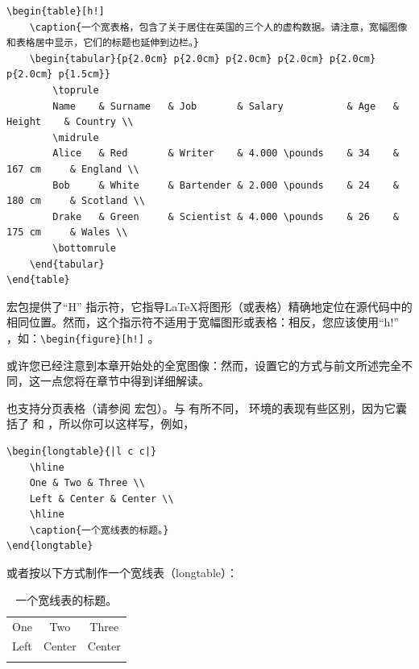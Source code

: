 \begin{lstlisting}[caption=如何设置一个宽宽的表]
\begin{table}[h!]
    \caption{一个宽表格，包含了关于居住在英国的三个人的虚构数据。请注意，宽幅图像和表格居中显示，它们的标题也延伸到边栏。}
    \begin{tabular}{p{2.0cm} p{2.0cm} p{2.0cm} p{2.0cm} p{2.0cm} p{2.0cm} p{1.5cm}}
        \toprule
        Name    & Surname   & Job       & Salary           & Age   & Height    & Country \\
        \midrule
        Alice   & Red       & Writer    & 4.000 \pounds    & 34    & 167 cm     & England \\
        Bob     & White     & Bartender & 2.000 \pounds    & 24    & 180 cm     & Scotland \\
        Drake   & Green     & Scientist & 4.000 \pounds    & 26    & 175 cm     & Wales \\
        \bottomrule
    \end{tabular}
\end{table}
\end{lstlisting}

 宏包提供了\enquote{H} 指示符，它指导\LaTeX 将图形（或表格）精确地定位在源代码中的相同位置。然而，这个指示符不适用于宽幅图形或表格：相反，您应该使用\enquote{h!} ，如：\lstinline|\begin{figure}[h!]| 。

或许您已经注意到本章开始处的全宽图像：然而，设置它的方式与前文所述完全不同，这一点您将在章节中得到详细解读。

 也支持分页表格（请参阅  宏包）。与  有所不同， 环境的表现有些区别，因为它囊括了  和 ，所以你可以这样写，例如，

\begin{lstlisting}[caption=一个longtable的例子]
\begin{longtable}{|l c c|}
    \hline
    One & Two & Three \\
    Left & Center & Center \\
    \hline
    \caption{一个宽线表的标题。}
\end{longtable}
\end{lstlisting}

或者按以下方式制作一个宽线表（longtable）：

\begin{longtable}{|l c c|}
    \hline
    One & Two & Three \\
    Left & Center & Center \\
    \hline
    \caption{一个宽线表的标题。}
\end{longtable}

